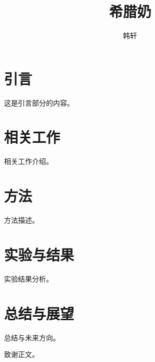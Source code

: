 \documentclass[format=draft,language=chinese,category=academic-report]{hustreport}
\title{希腊奶}
\author{韩轩}
\begin{document}
\frontmatter
\maketitle
\makeabstract
\tableofcontents

\mainmatter

\chapter{引言}

这是引言部分的内容。

\chapter{相关工作}

相关工作介绍。

\chapter{方法}

方法描述。

\chapter{实验与结果}

实验结果分析。

\chapter{总结与展望}

总结与未来方向。

\backmatter

\begin{ack}
致谢正文。
\end{ack}


\end{document}
